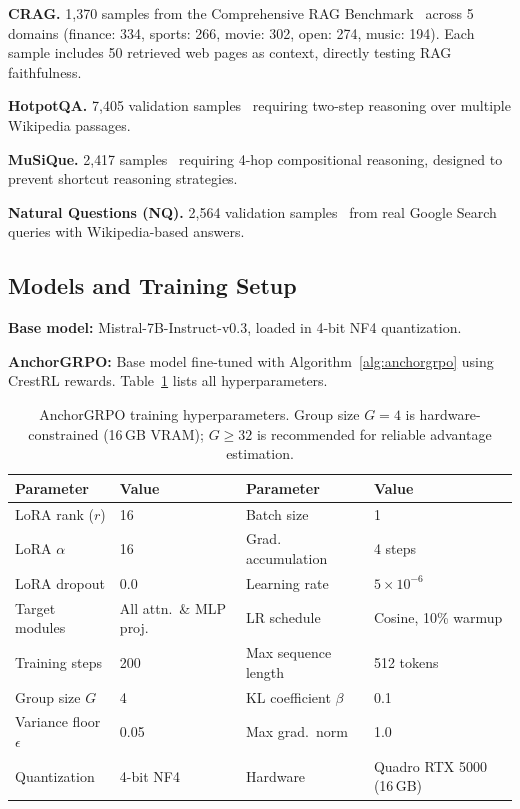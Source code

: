 \documentclass[11pt]{article}
\begin{document}
\textbf{CRAG.} 1{,}370 samples from the Comprehensive RAG Benchmark~\cite{crag2024} across 5 domains (finance: 334, sports: 266, movie: 302, open: 274, music: 194). Each sample includes 50 retrieved web pages as context, directly testing RAG faithfulness.

\textbf{HotpotQA.} 7{,}405 validation samples~\cite{yang2018hotpotqa} requiring two-step reasoning over multiple Wikipedia passages.

\textbf{MuSiQue.} 2{,}417 samples~\cite{trivedi2022musique} requiring 4-hop compositional reasoning, designed to prevent shortcut reasoning strategies.

\textbf{Natural Questions (NQ).} 2{,}564 validation samples~\cite{kwiatkowski2019natural} from real Google Search queries with Wikipedia-based answers.

\subsection{Models and Training Setup}

\textbf{Base model:} Mistral-7B-Instruct-v0.3, loaded in 4-bit NF4 quantization.

\textbf{AnchorGRPO:} Base model fine-tuned with Algorithm~\ref{alg:anchorgrpo} using CrestRL rewards. Table~\ref{tab:training} lists all hyperparameters.

\begin{table}[t]
\centering
\caption{AnchorGRPO training hyperparameters. Group size $G=4$ is hardware-constrained (16\,GB VRAM); $G\geq32$ is recommended for reliable advantage estimation.}
\label{tab:training}
\begin{tabular}{ll|ll}
\toprule
\textbf{Parameter} & \textbf{Value} & \textbf{Parameter} & \textbf{Value} \\
\midrule
LoRA rank ($r$) & 16 & Batch size & 1 \\
LoRA $\alpha$ & 16 & Grad. accumulation & 4 steps \\
LoRA dropout & 0.0 & Learning rate & $5 \times 10^{-6}$ \\
Target modules & All attn.\ \& MLP proj. & LR schedule & Cosine, 10\% warmup \\
Training steps & 200 & Max sequence length & 512 tokens \\
Group size $G$ & 4 & KL coefficient $\beta$ & 0.1 \\
Variance floor $\epsilon$ & 0.05 & Max grad.\ norm & 1.0 \\
Quantization & 4-bit NF4 & Hardware & Quadro RTX 5000 (16\,GB) \\
\bottomrule
\end{tabular}
\end{table}
\end{document}
